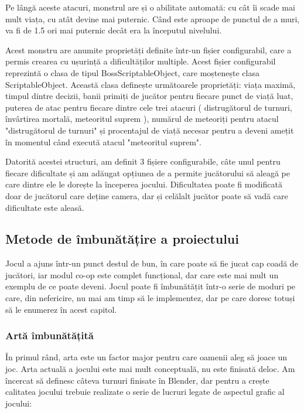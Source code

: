 \documentclass[12pt, a4paper]{article}
\begin{document}
	Pe lângă aceste atacuri, monstrul are și o abilitate automată: cu cât îi scade mai mult viața, cu atât devine mai puternic. Când este aproape de punctul de a muri, va fi de 1.5 ori mai puternic decât era la începutul nivelului.
	\newline
	
	Acest monstru are anumite proprietăți definite într-un fișier configurabil, care a permis crearea cu ușurință a dificultăților multiple. Acest fișier configurabil reprezintă o clasa de tipul BossScriptableObject, care moștenește clasa ScriptableObject. Această clasa definește următoarele proprietăți: viața maximă, timpul dintre decizii, banii primiți de jucător pentru fiecare punct de viață luat, puterea de atac pentru fiecare dintre cele trei atacuri ( distrugătorul de turnuri, învârtirea mortală, meteoritul suprem ), numărul de meteoriți pentru atacul "distrugătorul de turnuri" și procentajul de viață necesar pentru a deveni amețit în momentul când execută atacul "meteoritul suprem".
	\newline
	
	Datorită acestei structuri, am definit 3 fișiere configurabile, câte unul pentru fiecare dificultate și am adăugat opțiunea de a permite jucătorului să aleagă pe care dintre ele le dorește la începerea jocului. Dificultatea poate fi modificată doar de jucătorul care deține camera, dar și celălalt jucător poate să vadă care dificultate este aleasă.
	
	
	
	
	
	\subsection{Metode de îmbunătățire a proiectului}
	
	Jocul a ajuns într-un punct destul de bun, în care poate să fie jucat cap coadă de jucători, iar modul co-op este complet funcțional, dar care este mai mult un exemplu de ce poate deveni. Jocul poate fi îmbunătățit într-o serie de moduri pe care, din nefericire, nu mai am timp să le implementez, dar pe care doresc totuși să le enumerez în acest capitol.
	
	
	
	
	
	\subsubsection{Artă îmbunătățită}
	
	În primul rând, arta este un factor major pentru care oamenii aleg să joace un joc. Arta actuală a jocului este mai mult conceptuală, nu este finisată deloc. Am încercat să definesc câteva turnuri finisate în Blender, dar pentru a crește calitatea jocului trebuie realizate o serie de lucruri legate de aspectul grafic al jocului:
	
\end{document}
